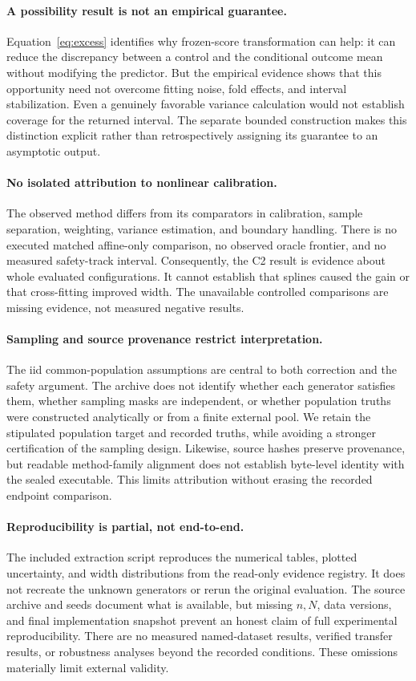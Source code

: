 \documentclass{article}
\begin{document}
\paragraph{A possibility result is not an empirical guarantee.}
Equation~\ref{eq:excess} identifies why frozen-score transformation can help: it can reduce the discrepancy between a control and the conditional outcome mean without modifying the predictor. But the empirical evidence shows that this opportunity need not overcome fitting noise, fold effects, and interval stabilization. Even a genuinely favorable variance calculation would not establish coverage for the returned interval. The separate bounded construction makes this distinction explicit rather than retrospectively assigning its guarantee to an asymptotic output.

\paragraph{No isolated attribution to nonlinear calibration.}
The observed method differs from its comparators in calibration, sample separation, weighting, variance estimation, and boundary handling. There is no executed matched affine-only comparison, no observed oracle frontier, and no measured safety-track interval. Consequently, the C2 result is evidence about whole evaluated configurations. It cannot establish that splines caused the gain or that cross-fitting improved width. The unavailable controlled comparisons are missing evidence, not measured negative results.

\paragraph{Sampling and source provenance restrict interpretation.}
The iid common-population assumptions are central to both correction and the safety argument. The archive does not identify whether each generator satisfies them, whether sampling masks are independent, or whether population truths were constructed analytically or from a finite external pool. We retain the stipulated population target and recorded truths, while avoiding a stronger certification of the sampling design. Likewise, source hashes preserve provenance, but readable method-family alignment does not establish byte-level identity with the sealed executable. This limits attribution without erasing the recorded endpoint comparison.

\paragraph{Reproducibility is partial, not end-to-end.}
The included extraction script reproduces the numerical tables, plotted uncertainty, and width distributions from the read-only evidence registry. It does not recreate the unknown generators or rerun the original evaluation. The source archive and seeds document what is available, but missing $n,N$, data versions, and final implementation snapshot prevent an honest claim of full experimental reproducibility. There are no measured named-dataset results, verified transfer results, or robustness analyses beyond the recorded conditions. These omissions materially limit external validity.
\end{document}
